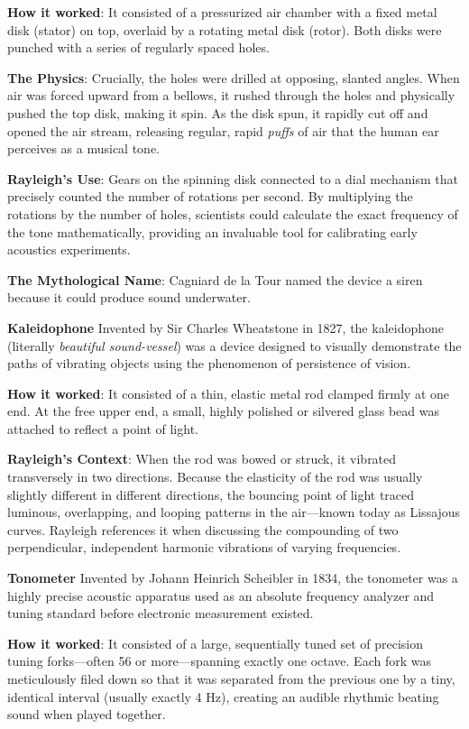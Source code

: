 \textbf{How it worked}: It consisted of a pressurized air chamber with a
fixed metal disk (stator) on top, overlaid by a rotating metal disk
(rotor). Both disks were punched with a series of regularly spaced
holes.

\textbf{The Physics}: Crucially, the holes were drilled at opposing,
slanted angles. When air was forced upward from a bellows, it rushed
through the holes and physically pushed the top disk, making it spin. As
the disk spun, it rapidly cut off and opened the air stream, releasing
regular, rapid \textit{puffs} of air that the human ear perceives as a musical
tone.

\textbf{Rayleigh's Use}: Gears on the spinning disk connected to a dial
mechanism that precisely counted the number of rotations per second. By
multiplying the rotations by the number of holes, scientists could
calculate the exact frequency of the tone mathematically, providing an
invaluable tool for calibrating early acoustics experiments.

\textbf{The Mythological Name}:
Cagniard de la Tour named the device a siren because it could produce
sound underwater.

\textbf{Kaleidophone} Invented by Sir Charles Wheatstone in 1827, the
kaleidophone (literally \textit{beautiful sound-vessel}) was a device designed
to visually demonstrate the paths of vibrating objects using the
phenomenon of persistence of vision.

\textbf{How it worked}: It consisted of a thin, elastic metal rod
clamped firmly at one end. At the free upper end, a small, highly
polished or silvered glass bead was attached to reflect a point of
light.

\textbf{Rayleigh's Context}: When the rod was bowed or struck, it
vibrated transversely in two directions. Because the elasticity of the
rod was usually slightly different in different directions, the bouncing
point of light traced luminous, overlapping, and looping patterns in the
air---known today as Lissajous curves. Rayleigh references it when
discussing the compounding of two perpendicular, independent harmonic
vibrations of varying frequencies.

\textbf{Tonometer} Invented by Johann Heinrich Scheibler in 1834, the tonometer
was a highly precise acoustic apparatus used as an absolute frequency
analyzer and tuning standard before electronic measurement existed.

\textbf{How it worked}: It consisted of a large, sequentially tuned set
of precision tuning forks---often 56 or more---spanning exactly one
octave. Each fork was meticulously filed down so that it was separated
from the previous one by a tiny, identical interval (usually exactly 4
Hz), creating an audible rhythmic beating sound when played together.

